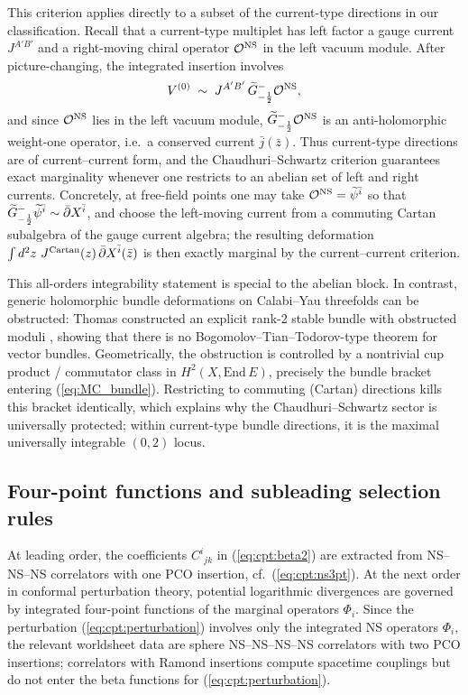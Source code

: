 \documentclass[12pt]{article}
\newcommand{\wt}[1]{\widetilde{#1}}
\newcommand{\bz}{\bar{z}}
\begin{document}
			This criterion applies directly to a subset of the current-type directions in our classification. Recall that a current-type multiplet has left factor a gauge current $J^{A'B'}$ and a right-moving chiral operator ${\cal O}^{\rm NS}$ in the left vacuum module. After picture-changing, the integrated insertion involves
				\[
				V^{(0)} \;\sim\; J^{A'B'}\,\wt G^-_{-{1\over 2}}{\cal O}^{\rm NS},
				\]
				and since ${\cal O}^{\rm NS}$ lies in the left vacuum module, $\wt G^-_{-{1\over 2}}{\cal O}^{\rm NS}$ is an anti-holomorphic weight-one operator, i.e.\ a conserved current $\bar j(\bz)$. Thus current-type directions are of current--current form, and the Chaudhuri--Schwartz criterion guarantees exact marginality whenever one restricts to an abelian set of left and right currents. Concretely, at free-field points one may take ${\cal O}^{\rm NS}=\wt\psi^{\bar i}$ so that $\wt G^-_{-{1\over 2}}\wt\psi^{\bar i}\sim \bar\partial X^{\bar i}$, and choose the left-moving current from a commuting Cartan subalgebra of the gauge current algebra; the resulting deformation $\int d^2z~J^{\rm Cartan}(z)\,\bar\partial X^{\bar i}(\bz)$ is then exactly marginal by the current--current criterion.

				This all-orders integrability statement is special to the abelian block. In contrast, generic holomorphic bundle deformations on Calabi--Yau threefolds can be obstructed: Thomas constructed an explicit rank-2 stable bundle with obstructed moduli \cite{Thomas:1999}, showing that there is no Bogomolov--Tian--Todorov-type theorem for vector bundles. Geometrically, the obstruction is controlled by a nontrivial cup product / commutator class in $H^2(X,\mathrm{End}\,E)$, precisely the bundle bracket entering (\ref{eq:MC_bundle}). Restricting to commuting (Cartan) directions kills this bracket identically, which explains why the Chaudhuri--Schwartz sector is universally protected; within current-type bundle directions, it is the maximal universally integrable $(0,2)$ locus.
			
			\subsection{Four-point functions and subleading selection rules}\label{sec:4pt_selection}
		
		At leading order, the coefficients $C^i{}_{jk}$ in (\ref{eq:cpt:beta2}) are extracted from NS--NS--NS correlators with one PCO insertion, cf.\ (\ref{eq:cpt:ns3pt}). At the next order in conformal perturbation theory, potential logarithmic divergences are governed by integrated four-point functions of the marginal operators $\Phi_i$. Since the perturbation (\ref{eq:cpt:perturbation}) involves only the integrated NS operators $\Phi_i$, the relevant worldsheet data are sphere NS--NS--NS--NS correlators with two PCO insertions; correlators with Ramond insertions compute spacetime couplings but do not enter the beta functions for (\ref{eq:cpt:perturbation}).
	
\end{document}
